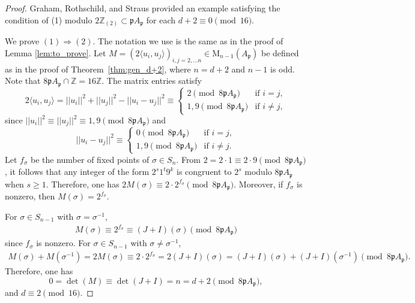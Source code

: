 \documentclass[a4paper, 11pt]{article}
\newcommand{\Z}{\mathbb{Z}}
\newcommand{\p}{\mathfrak{p}}
\newcommand{\la}{\langle}
\newcommand{\ra}{\rangle}
\theoremstyle{definition}
\begin{document}
\begin{proof}
     Graham, Rothschild, and Straus \cite{GRS74} provided an example satisfying the condition of (1) modulo $2\Z_{(2)} \subset \p A_\p $ for each $d+2 \equiv 0 \pmod{16}$.  

   We prove $(1) \Rightarrow (2)$. The notation we use is the same as in the proof of Lemma \ref{lem:to_prove}. 
   Let $M=(2\la u_i, u_j \ra)_{i,j=2,\ldots n} \in \mathrm{M}_{n-1}(A_\p)$ be defined as in the proof of Theorem~\ref{thm:gen_d+2}, where $n=d+2$ and $n-1$ is odd. Note that $8 \p A_\p \cap \Z=16 \Z$. The matrix entries satisfy
   \[
2\la u_i, u_j \ra =||u_i||^2+||u_j||^2-||u_i-u_j||^2 \equiv
\begin{cases}
2 \pmod{8 \p A_{\p}} & \text{if } i = j,\\
1,9 \pmod{8 \p A_{\p}} & \text{if } i \ne j,
\end{cases}
\]
since $||u_i||^2\equiv ||u_j||^2\equiv 1,9 \pmod{8 \p A_\p}$ and 
\[
||u_i-u_j||^2\equiv \begin{cases}
    0 \pmod{8 \p A_\p}& \text{if } i = j,\\
    1,9 \pmod{8 \p A_\p}& \text{if } i \ne j.
\end{cases}
\]
Let $f_{\sigma}$ be the number of fixed points of $\sigma \in S_n$. 
From $2 = 2 \cdot 1 \equiv 2 \cdot 9 \pmod{8 \mathfrak{p} A_\mathfrak{p}}$, it follows that any integer of the form $2^s 1^t 9^k$ is congruent to $2^s$ modulo $8 \mathfrak{p} A_\mathfrak{p}$ when $s \geq 1$.  
Therefore, one has $2M(\sigma)\equiv 2\cdot 2^{f_{\sigma}} \pmod{8 \p A_\p}$. 
Moreover, if $f_\sigma$ is nonzero, then $M(\sigma)=2^{f_{\sigma}}$.  


For $\sigma \in S_{n-1}$ with $\sigma = \sigma^{-1}$, 
\begin{align*}
    M(\sigma)\equiv 2^{f_{\sigma}} \equiv (J+I)(\sigma) \pmod{8 \p A_\p}
\end{align*}
since $f_{\sigma}$ is nonzero. 
For $\sigma \in S_{n-1}$ with $\sigma \ne \sigma^{-1}$, 
\begin{align*}
    M(\sigma)+M(\sigma^{-1})=2 M(\sigma) \equiv 2 \cdot 2^{f_{\sigma}} = 2(J+I)(\sigma)= (J+I)(\sigma)+(J+I)(\sigma^{-1})\pmod{8 \p A_\p}.
\end{align*}
Therefore, one has
\[
0=\det(M) \equiv \det(J+I) = n =d+2 \pmod{8\p A_\p},
\]
and $d\equiv 2 \pmod{16}$. 
\end{proof}
   
   
   
\end{document}
